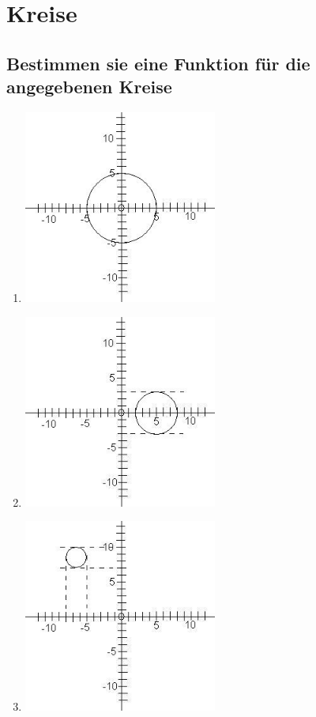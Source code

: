 \section{Kreise}

\subsection{Bestimmen sie eine Funktion für die angegebenen Kreise}

\begin{enumerate}
\item
\begin{center}
\includegraphics[width=0.5\textwidth]{img/Aufgaben/Kreise/K1.jpg}
\end{center}

 
\item
\begin{center}
\includegraphics[width=0.5\textwidth]{img/Aufgaben/Kreise/K2.jpg}
\end{center}

\item
\begin{center}
\includegraphics[width=0.5\textwidth]{img/Aufgaben/Kreise/K3.jpg}
\end{center}


\end{enumerate}
